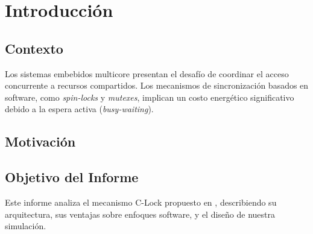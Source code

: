
\section{Introducción}


\subsection{Contexto}

Los sistemas embebidos multicore presentan el desafío de coordinar el acceso concurrente
a recursos compartidos. Los mecanismos de sincronización basados en software, como
\textit{spin-locks} y \textit{mutexes}, implican un costo energético significativo debido
a la espera activa (\textit{busy-waiting}).

\subsection{Motivación}


\subsection{Objetivo del Informe}

Este informe analiza el mecanismo C-Lock propuesto en \cite{clock2023}, describiendo
su arquitectura, sus ventajas sobre enfoques software, y el diseño de nuestra
simulación.
